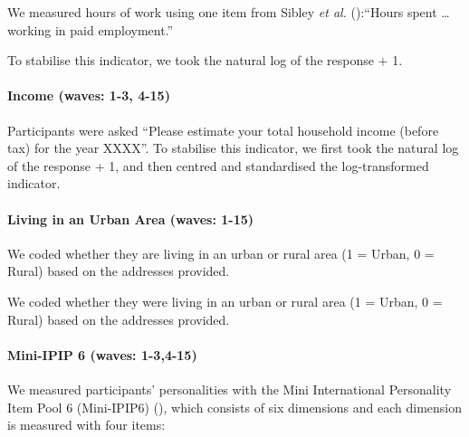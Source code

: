 \documentclass[
  single column]{article}
\let\oldparagraph\paragraph
\renewcommand{\paragraph}[1]{\oldparagraph{#1}\mbox{}}
\begin{document}
We measured hours of work using one item from Sibley \emph{et al.}
():``Hours spent \ldots{} working in paid
employment.''

To stabilise this indicator, we took the natural log of the response +
1.

\paragraph{Income (waves: 1-3, 4-15)}\label{income-waves-1-3-4-15}

Participants were asked ``Please estimate your total household income
(before tax) for the year XXXX''. To stabilise this indicator, we first
took the natural log of the response + 1, and then centred and
standardised the log-transformed indicator.

\paragraph{Living in an Urban Area (waves:
1-15)}\label{living-in-an-urban-area-waves-1-15}

We coded whether they are living in an urban or rural area (1 = Urban, 0
= Rural) based on the addresses provided.

We coded whether they were living in an urban or rural area (1 = Urban,
0 = Rural) based on the addresses provided.

\paragraph{Mini-IPIP 6 (waves:
1-3,4-15)}\label{mini-ipip-6-waves-1-34-15}

We measured participants' personalities with the Mini International
Personality Item Pool 6 (Mini-IPIP6) (), which consists of six dimensions and each
dimension is measured with four items:
\end{document}
